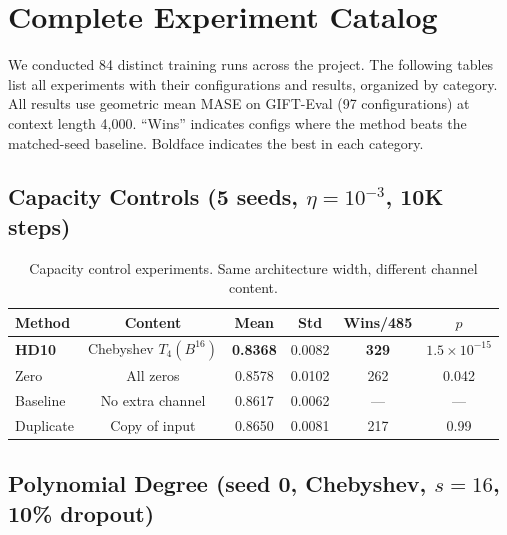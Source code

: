 \documentclass[11pt]{article}
\begin{document}
\section{Complete Experiment Catalog}
\label{app:catalog}

We conducted 84 distinct training runs across the project. The following tables list all experiments with their configurations and results, organized by category. All results use geometric mean MASE on GIFT-Eval (97 configurations) at context length 4,000. ``Wins'' indicates configs where the method beats the matched-seed baseline. Boldface indicates the best in each category.

\subsection{Capacity Controls (5 seeds, $\eta = 10^{-3}$, 10K steps)}

\begin{table}[h]
\centering
\caption{Capacity control experiments. Same architecture width, different channel content.}
\label{tab:catalog_capacity}
\small
\begin{tabular}{lccccc}
\toprule
\textbf{Method} & \textbf{Content} & \textbf{Mean} & \textbf{Std} & \textbf{Wins/485} & \textbf{$p$} \\
\midrule
\textbf{HD10} & Chebyshev $T_4(B^{16})$ & \textbf{0.8368} & 0.0082 & \textbf{329} & $1.5 \times 10^{-15}$ \\
Zero & All zeros & 0.8578 & 0.0102 & 262 & 0.042 \\
Baseline & No extra channel & 0.8617 & 0.0062 & --- & --- \\
Duplicate & Copy of input & 0.8650 & 0.0081 & 217 & 0.99 \\
\bottomrule
\end{tabular}
\end{table}

\subsection{Polynomial Degree (seed 0, Chebyshev, $s=16$, 10\% dropout)}
\end{document}
